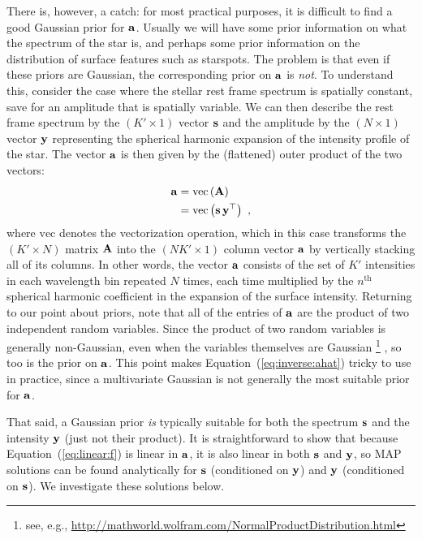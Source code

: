 \documentclass[modern]{aastex631}
\begin{document}
There is, however, a catch: for most practical purposes, it is difficult to find a good Gaussian prior for ${\mathbf{a}}$. 
Usually we will have some prior information on what the spectrum of the star is, and perhaps some prior information on the distribution of surface features such as starspots. 
The problem is that even if these priors are Gaussian, the corresponding prior on ${\mathbf{a}}$ is \emph{not}. 
To understand this, consider the case where the stellar rest frame spectrum is spatially constant, save for an amplitude that is spatially variable. 
We can then describe the rest frame spectrum by the $(K' \times 1)$ vector ${\mathbf{s}}$ and the amplitude by the $(N \times 1)$ vector ${\mathbf{y}}$ representing the spherical harmonic expansion of the intensity profile of the star. 
The vector ${\mathbf{a}}$ is then given by the (flattened) outer product of the two vectors:
%
\begin{align}
    \label{eq:inverse:alm}
    {\ensuremath{\mathbf{a}}} & = \mathrm{vec}\left( {\mathbf{A}} \right) \nonumber             \\
           & = \mathrm{vec}\left( {\mathbf{s}} \, {\mathbf{y}}^\top \right) \hskip 0.33em,
\end{align}
%
where $\mathrm{vec}$ denotes the vectorization operation, which in this case transforms the $(K' \times N)$ matrix ${\mathbf{A}}$ into the $(N K' \times 1)$ column vector ${\mathbf{a}}$ by vertically stacking all of its columns. 
In other words, the vector ${\mathbf{a}}$ consists of the set of $K'$ intensities in each wavelength bin repeated $N$ times, each time multiplied by the $n^\mathrm{th}$ spherical harmonic coefficient in the expansion of the surface intensity. 
Returning to our point about priors, note that all of the entries of ${\mathbf{a}}$ are the product of two independent random variables. 
Since the product of two random variables is generally non-Gaussian, even when the variables themselves are Gaussian%
\footnote{see, e.g., \url{http://mathworld.wolfram.com/NormalProductDistribution.html}}%
, so too is the prior on ${\mathbf{a}}$. 
This point makes Equation~(\ref{eq:inverse:ahat}) tricky to use in practice, since a multivariate Gaussian is not generally the most suitable prior for ${\mathbf{a}}$.

That said, a Gaussian prior \emph{is} typically suitable for both the spectrum ${\mathbf{s}}$ and the intensity ${\mathbf{y}}$ (just not their product). 
It is straightforward to show that because Equation~(\ref{eq:linear:f}) is linear in ${\mathbf{a}}$, it is also linear in both ${\mathbf{s}}$ and ${\mathbf{y}}$, so MAP solutions can be found analytically for ${\mathbf{s}}$ (conditioned on ${\mathbf{y}}$) and ${\mathbf{y}}$ (conditioned on ${\mathbf{s}}$). 
We investigate these solutions below.
\end{document}
